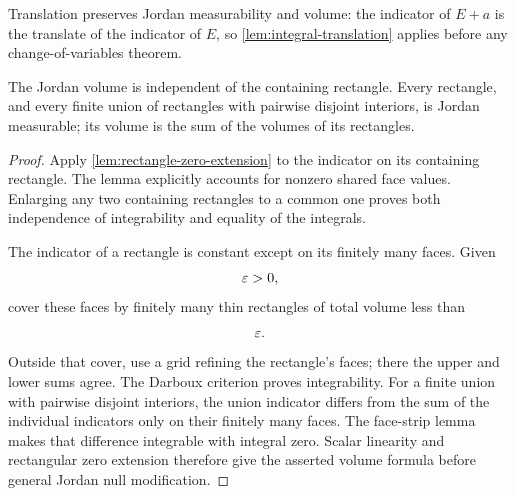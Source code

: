 Translation preserves Jordan measurability and volume: the indicator of
$E+a$ is the translate of the indicator of $E$, so
\cref{lem:integral-translation} applies before any change-of-variables theorem.

\begin{proposition}
\label{prop:jordan-basic}
The Jordan volume is independent of the containing rectangle.  Every
rectangle, and every finite union of rectangles with pairwise disjoint
interiors, is Jordan measurable; its volume is the sum of the volumes of its
rectangles.
\end{proposition}
\begin{proof}
Apply \cref{lem:rectangle-zero-extension} to the indicator on its
containing rectangle. The lemma explicitly accounts for nonzero shared
face values. Enlarging any two containing rectangles to a common one
proves both independence of integrability and equality of the integrals.

The indicator of a rectangle is constant except on its finitely many faces.
Given
\[
\varepsilon>0,
\]
cover these faces by finitely many thin rectangles of total volume less than
\[
\varepsilon.
\]
Outside that cover, use a grid refining the rectangle's faces; there the
upper and lower sums agree.  The Darboux criterion proves integrability.
For a finite union with pairwise disjoint interiors, the union indicator
differs from the sum of the individual indicators only on their finitely
many faces. The face-strip lemma makes that difference integrable with
integral zero. Scalar linearity and rectangular zero extension therefore
give the asserted volume formula before general Jordan null modification.
\end{proof}


